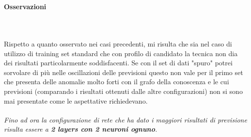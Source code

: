 \paragraph{Osservazioni}\mbox{}
\label{Osservazioni su rete a 4 neuroni per 1 layer}
\\\\
\noindent
Rispetto a quanto osservato nei casi precedenti, mi risulta che sia nel caso di utilizzo di training set standard che con profilo di candidato la tecnica non dia dei risultati particolarmente soddisfacenti. Se con il set di dati "spuro" potrei sorvolare di pi\`u nelle oscillazioni delle previsioni questo non vale per il primo set che presenta delle anomalie molto forti con il grafo della conoscenza e le cui previsioni (comparando i risultati ottenuti dalle altre configurazioni) non si sono mai presentate come le aspettative richiedevano.
\\\\
\noindent
\textit{Fino ad ora la configurazione di rete che ha dato i maggiori risultati di previsione risulta essere a \textbf{2 layers con 2 neuroni ognuno}.}



